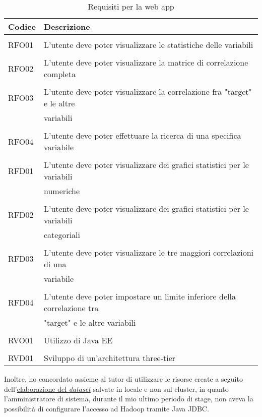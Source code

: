 \clearpage
\begin{table}[!h] %
	\caption{Requisiti per la web app} \label{req-web-app}
	\label{tab:requisiti-app}
	\centering
	\begin{tabular}{ l | l }
		\textbf{Codice} & \textbf{Descrizione}\\
		\hline
		\hline
		\\[-2.5mm]
		RFO01 & L'utente deve poter visualizzare le statistiche delle variabili \\
		\hline
		\\[-2.5mm]
		RFO02 & L'utente deve poter visualizzare la matrice di correlazione completa \\
		\hline
		\\[-2.5mm]
		RFO03 & L'utente deve poter visualizzare la correlazione fra "target" e le altre \\ & variabili \\
		\hline
		\\[-2.5mm]
		RFO04 & L'utente deve poter effettuare la ricerca di una specifica variabile \\
		\hline
		\hline
		\\[-2.5mm]
		RFD01 & L'utente deve poter visualizzare dei grafici statistici per le variabili \\ & numeriche \\
		\hline
		\\[-2.5mm]
		RFD02 & L'utente deve poter visualizzare dei grafici statistici per le variabili \\ & categoriali \\
		\hline
		\\[-2.5mm]
		RFD03 & L'utente deve poter visualizzare le tre maggiori correlazioni di una \\ 
		& variabile \\
		\hline
		\\[-2.5mm]
		RFD04 & L'utente deve poter impostare un limite inferiore della correlazione tra \\ & "target" e le altre variabili \\
		\hline
		\hline
		\\[-2.5mm]
		RVO01 & Utilizzo di Java EE \\
		\hline
		\hline
		\\[-2.5mm]
		RVD01 & Sviluppo di un'architettura three-tier \\
		\hline
		\end{tabular}
\end{table}%
Inoltre, ho concordato assieme al tutor di utilizzare le risorse create a seguito dell'\hyperref[dataset]{elaborazione del \textit{dataset}} salvate in locale e non sul \gls{cluster}, in quanto l'amministratore di sistema, durante il mio ultimo periodo di stage, non aveva la possibilità di configurare l'accesso ad Hadoop tramite \gls{Java JDBC}. \\
